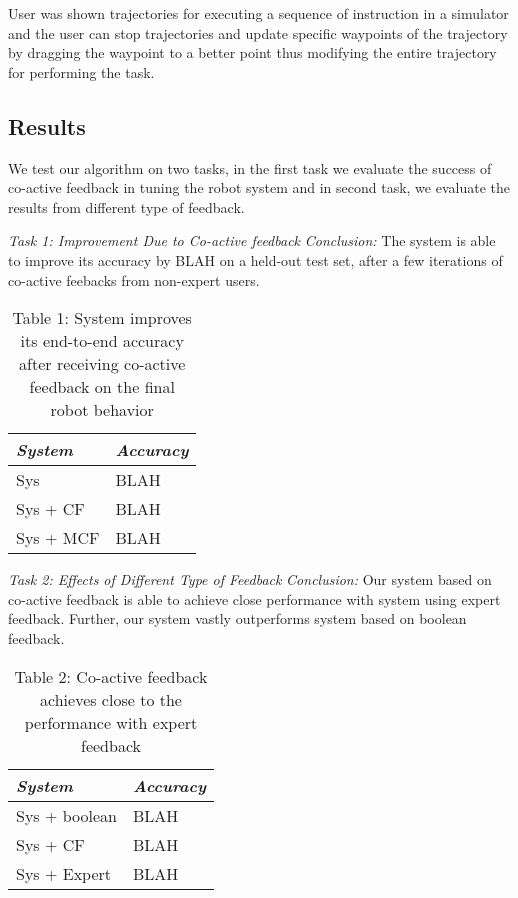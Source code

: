 	User was shown trajectories for executing a sequence of instruction in a simulator and the user can stop trajectories and update specific waypoints of the trajectory by dragging the waypoint to a better point thus modifying the entire trajectory for performing the task.


\subsection{Results} 
We test our algorithm on two tasks, in the first task we evaluate the success of co-active feedback in tuning the robot system and in second task, we evaluate the results from different type of feedback.

\noindent\textit{Task 1: Improvement Due to Co-active feedback}
\textit{Conclusion:} The system is able to improve its accuracy by BLAH on a held-out test set, after a few iterations of co-active feebacks from non-expert users.

\begin{table}
\label{tbl:tsk1}
\caption{Table 1: System improves its end-to-end accuracy after receiving co-active feedback on the final robot behavior}
\centering
\begin{tabular}{|l|l|}
\hline
\textit{System} & \textit{Accuracy} \\
\hline
Sys & BLAH \\
Sys + CF & BLAH \\
Sys + MCF & BLAH \\
\hline
\end{tabular}
\end{table}

\noindent\textit{Task 2: Effects of Different Type of Feedback}
\textit{Conclusion:} Our system based on co-active feedback is able to achieve close performance with system using expert feedback. Further, our system vastly outperforms system based on boolean feedback.

\begin{table}
\label{tbl:tsk2}
\caption{Table 2: Co-active feedback achieves close to the performance with expert feedback}
\centering
\begin{tabular}{|l|l|}
\hline
\textit{System} & \textit{Accuracy} \\
\hline
Sys + boolean & BLAH\\
Sys + CF & BLAH \\
Sys + Expert & BLAH \\
\hline
\end{tabular}
\end{table}


